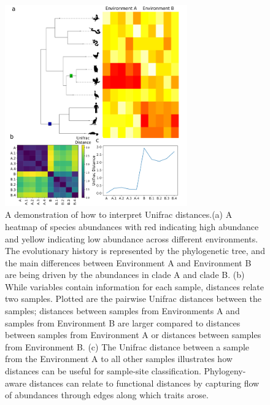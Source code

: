 \begin{figure}[H]
        \centering
        \includegraphics[width=0.7\textwidth]{ch1/figure3.png}
        \caption[A demonstration of how to interpret Unifrac distances.]
        {A demonstration of how to interpret Unifrac distances.(a) A heatmap of species abundances with red indicating high abundance and yellow indicating low abundance across different environments.  The evolutionary history is represented by the phylogenetic tree, and the main differences between Environment A and Environment B are being driven by the abundances in clade A and clade B. (b) While variables contain information for each sample, distances relate two samples. Plotted are the pairwise Unifrac distances between the samples; distances between samples from Environments A and samples from Environment B are larger compared to distances between samples from Environment A or distances between samples from Environment B. (c) The Unifrac distance between a sample from the Environment A to all other samples illustrates how distances can be useful for sample-site classification. Phylogeny-aware distances can relate to functional distances by capturing flow of abundances through edges along which traits arose.}
        \label{figa3}
\end{figure}

